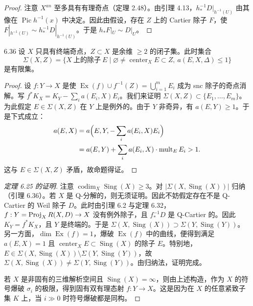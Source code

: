 \begin{proof}
注意 $X^{an}$ 至多具有有理奇点（定理 2.48）。由引理 4.13，$h_*^{-1}D|_{h^{-1}(U)}$ 由其像在 $\operatorname{Pic}h^{-1}(x)$ 中决定。因此由假设，存在 $Z$ 上的 Cartier 除子 $F$，使 $F|_{h^{-1}(U)}\sim h_*^{-1}D|_{h^{-1}(U)}$。于是 $h_*F|_U\sim D|_U$。
\end{proof}

\begin{lemmap}{6.36}
设 $X$ 只具有终端奇点，$Z\subset X$ 是余维 $\ge2$ 的闭子集。此时集合
\[
\Sigma(X,Z)=\{X\ \text{上的除子}\ E \mid \varnothing\ne\operatorname{center}_X E\subset Z,\ a(E,X,\Delta)\le1\}
\]
是有限集。
\end{lemmap}



\begin{proof}
设 $f:Y\to X$ 是使 $\operatorname{Ex}(f)\cup f^{-1}(Z)=\bigcup_{i=1}^m E_i$ 成为 snc 除子的奇点消解。写 $f^*K_X=K_Y-\sum_i a(E_i,X)E_i$。我们来证明 $\Sigma(X,Z)\subset\{E_1,\dots,E_m\}$。为此假定 $E\in\Sigma(X,Z)$ 在 $Y$ 上是例外的。由于 $Y$ 非奇异，有 $a(E,Y)\ge1$。于是下式成立：
\[
\begin{aligned}
a(E,X)&=a\Bigl(E,Y,-\sum_i a(E_i,X)E_i\Bigr)\\
&=a(E,Y)+\sum_i a(E_i,X)\cdot\operatorname{mult}_E E_i>1.
\end{aligned}
\]
这与 $E\in\Sigma(X,Z)$ 矛盾，故命题得证。
\end{proof}

\begin{proof}[定理 6.25 的证明]
注意 $\operatorname{codim}_X\operatorname{Sing}(X)\ge3$。对 $|\Sigma(X,\operatorname{Sing}(X))|$ 归纳（引理 6.36）。若 $X$ 是 Q-分解的，则无须证明。因此不妨假定存在不是 Q-Cartier 的 Weil 除子 $D$。此时由引理 6.2 与定理 6.32，$f:Y=\operatorname{Proj}_X R(X,D)\to X$ 没有例外除子，且 $f_*^{-1}D$ 是 Q-Cartier 的。因此 $K_Y=f^*K_X$，且 $Y$ 是终端的。于是 $\Sigma(X,\operatorname{Sing}(X))\supset\Sigma(Y,\operatorname{Sing}(Y))$。另一方面，$\dim\operatorname{Ex}(f)=1$，爆破 $\operatorname{Ex}(f)$ 中的曲线，便得到满足 $a(E,X)=1$ 且 $\operatorname{center}_X E\subset\operatorname{Sing}(X)$ 的除子 $E$。特别地，$E\in\Sigma(X,\operatorname{Sing}(X))\setminus\Sigma(Y,\operatorname{Sing}(Y))$，故 $\Sigma(X,\operatorname{Sing}(X))\ne\Sigma(Y,\operatorname{Sing}(Y))$。由归纳法，证明完成。

若 $X$ 是非固有的三维解析空间且 $\operatorname{Sing}(X)=\infty$，则由上述构造，作为 $X$ 的符号爆破 $\sigma_i$ 的极限，得到固有双有理态射 $f:Y\to X$。这是因为在 $X$ 的任意紧致子集 $K$ 上，当 $i\gg0$ 时符号爆破都是同构。
\end{proof}

